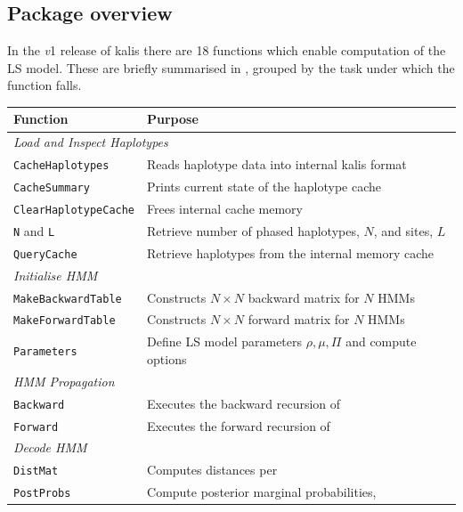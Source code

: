 \documentclass[a4paper]{article}
\newcommand{\pkg}[1]{{\fontseries{m}\fontseries{b}\selectfont #1}}
\begin{document}
\subsection*{Package overview}
\label{package-overview}

In the \emph{v}1 release of \pkg{kalis} there are 18 functions which enable computation of the LS model.
These are briefly summarised in , grouped by the task under which the function falls.


\begin{longtable}{ll}
	\toprule
	\textbf{Function} & \textbf{Purpose} \\
	\midrule
	\multicolumn{2}{l}{\emph{Load and Inspect Haplotypes}} \\
	\midrule
	\texttt{CacheHaplotypes} & Reads haplotype data into internal \pkg{kalis} format \\
	\texttt{CacheSummary} & Prints current state of the haplotype cache \\
	\texttt{ClearHaplotypeCache} & Frees internal cache memory \\
	\texttt{N} and \texttt{L} & Retrieve number of phased haplotypes, $N$, and sites, $L$ \\
	\texttt{QueryCache} & Retrieve haplotypes from the internal memory cache \\
	\midrule
	\multicolumn{2}{l}{\emph{Initialise HMM}} \\
	\midrule
	\texttt{MakeBackwardTable} & Constructs $N \times N$ backward matrix for $N$ HMMs \\
	\texttt{MakeForwardTable} & Constructs $N \times N$ forward matrix for $N$ HMMs \\
	\texttt{Parameters} & Define LS model parameters $\rho, \mu, \Pi$ and compute options \\
	\midrule
	\multicolumn{2}{l}{\emph{HMM Propagation}} \\
	\midrule
	\texttt{Backward} & Executes the backward recursion of \Cref{mainpaper:eq:bck0,mainpaper:eq:bck1} \\
	\texttt{Forward} & Executes the forward recursion of \Cref{mainpaper:eq:fwd0,mainpaper:eq:fwd1} \\
	\midrule
	\multicolumn{2}{l}{\emph{Decode HMM}} \\
	\midrule
	\texttt{DistMat} & Computes distances per \Cref{mainpaper:eq:distmat} \\
	\texttt{PostProbs} & Compute posterior marginal probabilities, \Cref{mainpaper:eq:postprob} \\

\end{longtable}
\end{document}
